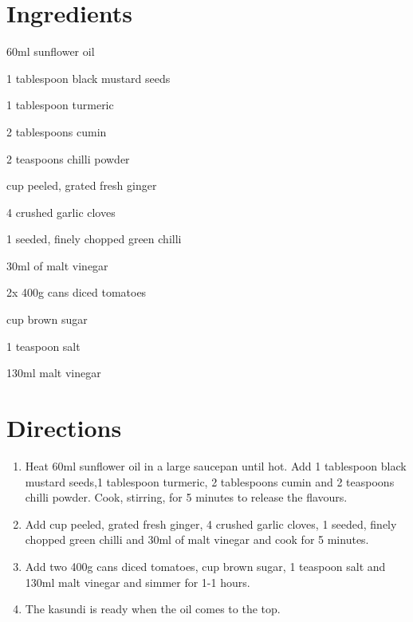\section*{Ingredients}
\begin{ingredients-list}
	\item 60ml sunflower oil
	\item 1 tablespoon black mustard seeds
	\item 1 tablespoon turmeric
	\item 2 tablespoons cumin
	\item 2 teaspoons chilli powder
	\item {} cup peeled, grated fresh ginger
	\item 4 crushed garlic cloves
	\item 1 seeded, finely chopped green chilli
	\item 30ml of malt vinegar
	\item 2x 400g cans diced tomatoes
	\item {} cup brown sugar
	\item 1 teaspoon salt
	\item 130ml malt vinegar
\end{ingredients-list}

\section*{Directions}
\begin{enumerate}
	\item Heat 60ml sunflower oil in a large saucepan until hot.
		Add 1 tablespoon black mustard seeds,1 tablespoon turmeric, 2 tablespoons cumin and 2 teaspoons chilli powder.
		Cook, stirring, for 5 minutes to release the flavours.
	\item Add  cup peeled, grated fresh ginger, 4 crushed garlic cloves, 1 seeded, finely chopped green chilli and 30ml of malt vinegar and cook for 5 minutes.
	\item Add two 400g cans diced tomatoes,  cup brown sugar, 1 teaspoon salt and 130ml malt vinegar and simmer for 1-1 hours.
	\item The kasundi is ready when the oil comes to the top.
\end{enumerate}

\label{caramelised_onion}
\hypertarget{caramelised_onion}{}%

